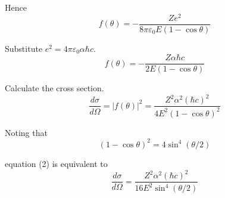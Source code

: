 Hence
\begin{equation*}
f(\theta)=-\frac{Ze^2}{8\pi\varepsilon_0E(1-\cos\theta)}
\end{equation*}

Substitute $e^2=4\pi\varepsilon_0\alpha\hbar c$.
\begin{equation*}
f(\theta)=-\frac{Z\alpha\hbar c}{2E(1-\cos\theta)}
\end{equation*}

Calculate the cross section.
\begin{equation*}
\frac{d\sigma}{d\Omega}=|f(\theta)|^2
=\frac{Z^2\alpha^2(\hbar c)^2}{4E^2(1-\cos\theta)^2}
\tag{2}
\end{equation*}

Noting that
\begin{equation*}
(1-\cos\theta)^2=4\sin^4(\theta/2)
\end{equation*}

equation (2) is equivalent to
\begin{equation*}
\frac{d\sigma}{d\Omega}=\frac{Z^2\alpha^2(\hbar c)^2}{16E^2\sin^4(\theta/2)}
\tag{3}
\end{equation*}


